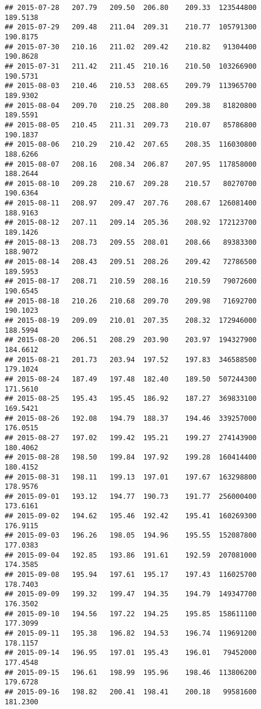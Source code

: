 \documentclass[
]{article}
\begin{document}
\begin{verbatim}
## 2015-07-28   207.79   209.50  206.80    209.33  123544800     189.5138
## 2015-07-29   209.48   211.04  209.31    210.77  105791300     190.8175
## 2015-07-30   210.16   211.02  209.42    210.82   91304400     190.8628
## 2015-07-31   211.42   211.45  210.16    210.50  103266900     190.5731
## 2015-08-03   210.46   210.53  208.65    209.79  113965700     189.9302
## 2015-08-04   209.70   210.25  208.80    209.38   81820800     189.5591
## 2015-08-05   210.45   211.31  209.73    210.07   85786800     190.1837
## 2015-08-06   210.29   210.42  207.65    208.35  116030800     188.6266
## 2015-08-07   208.16   208.34  206.87    207.95  117858000     188.2644
## 2015-08-10   209.28   210.67  209.28    210.57   80270700     190.6364
## 2015-08-11   208.97   209.47  207.76    208.67  126081400     188.9163
## 2015-08-12   207.11   209.14  205.36    208.92  172123700     189.1426
## 2015-08-13   208.73   209.55  208.01    208.66   89383300     188.9072
## 2015-08-14   208.43   209.51  208.26    209.42   72786500     189.5953
## 2015-08-17   208.71   210.59  208.16    210.59   79072600     190.6545
## 2015-08-18   210.26   210.68  209.70    209.98   71692700     190.1023
## 2015-08-19   209.09   210.01  207.35    208.32  172946000     188.5994
## 2015-08-20   206.51   208.29  203.90    203.97  194327900     184.6612
## 2015-08-21   201.73   203.94  197.52    197.83  346588500     179.1024
## 2015-08-24   187.49   197.48  182.40    189.50  507244300     171.5610
## 2015-08-25   195.43   195.45  186.92    187.27  369833100     169.5421
## 2015-08-26   192.08   194.79  188.37    194.46  339257000     176.0515
## 2015-08-27   197.02   199.42  195.21    199.27  274143900     180.4062
## 2015-08-28   198.50   199.84  197.92    199.28  160414400     180.4152
## 2015-08-31   198.11   199.13  197.01    197.67  163298800     178.9576
## 2015-09-01   193.12   194.77  190.73    191.77  256000400     173.6161
## 2015-09-02   194.62   195.46  192.42    195.41  160269300     176.9115
## 2015-09-03   196.26   198.05  194.96    195.55  152087800     177.0383
## 2015-09-04   192.85   193.86  191.61    192.59  207081000     174.3585
## 2015-09-08   195.94   197.61  195.17    197.43  116025700     178.7403
## 2015-09-09   199.32   199.47  194.35    194.79  149347700     176.3502
## 2015-09-10   194.56   197.22  194.25    195.85  158611100     177.3099
## 2015-09-11   195.38   196.82  194.53    196.74  119691200     178.1157
## 2015-09-14   196.95   197.01  195.43    196.01   79452000     177.4548
## 2015-09-15   196.61   198.99  195.96    198.46  113806200     179.6728
## 2015-09-16   198.82   200.41  198.41    200.18   99581600     181.2300

\end{verbatim}
\end{document}
